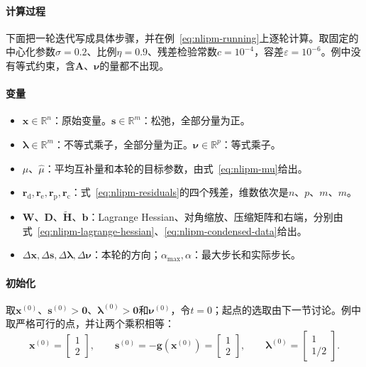 \paragraph{计算过程}
下面把一轮迭代写成具体步骤，并在例~\eqref{eq:nlipm-running}上逐轮计算。取固定的中心化参数$\sigma=0.2$、比例$\eta=0.9$、残差检验常数$c=10^{-4}$，容差$\varepsilon=10^{-6}$。例中没有等式约束，含$\bm{A}$、$\bm{\nu}$的量都不出现。

\paragraph{变量}
\begin{itemize}
 \item $\bm{x}\in\mathbb{R}^n$：原始变量。$\bm{s}\in\mathbb{R}^m$：松弛，全部分量为正。
 \item $\bm{\lambda}\in\mathbb{R}^m$：不等式乘子，全部分量为正。$\bm{\nu}\in\mathbb{R}^p$：等式乘子。
 \item $\mu$、$\hat{\mu}$：平均互补量和本轮的目标参数，由式~\eqref{eq:nlipm-mu}给出。
 \item $\bm{r}_{\mathrm{d}},\bm{r}_{\mathrm{e}},\bm{r}_{\mathrm{p}},\bm{r}_{\mathrm{c}}$：式~\eqref{eq:nlipm-residuals}的四个残差，维数依次是$n$、$p$、$m$、$m$。
 \item $\bm{W}$、$\bm{D}$、$\tilde{\bm{H}}$、$\bm{b}$：Lagrange Hessian、对角缩放、压缩矩阵和右端，分别由式~\eqref{eq:nlipm-lagrange-hessian}、\eqref{eq:nlipm-condensed-data}给出。
 \item $\Delta\bm{x},\Delta\bm{s},\Delta\bm{\lambda},\Delta\bm{\nu}$：本轮的方向；$\alpha_{\max},\alpha$：最大步长和实际步长。
\end{itemize}

\paragraph{初始化}
取$\bm{x}^{(0)}$、$\bm{s}^{(0)}>\bm{0}$、$\bm{\lambda}^{(0)}>\bm{0}$和$\bm{\nu}^{(0)}$，令$t=0$；起点的选取由下一节讨论。例中取严格可行的点，并让两个乘积相等：
\[
 \bm{x}^{(0)}=\begin{bmatrix}1\\2\end{bmatrix},\qquad
 \bm{s}^{(0)}=-\bm{g}(\bm{x}^{(0)})=\begin{bmatrix}1\\2\end{bmatrix},\qquad
 \bm{\lambda}^{(0)}=\begin{bmatrix}1\\1/2\end{bmatrix}.
\]

